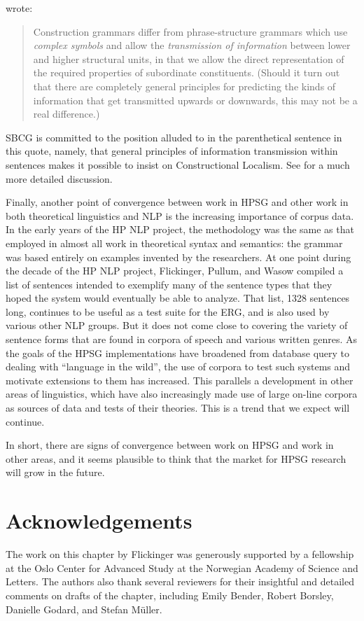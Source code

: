 \documentclass[output=paper]{langsci/langscibook}
\begin{document}
\citet[]{Fillmore88a} wrote:
\begin{quote}
Construction grammars differ from phrase-structure grammars which use \emph{complex symbols} and
allow the \emph{transmission of information} between lower and higher structural units, in that we
allow the direct representation of the required properties of subordinate constituents.  (Should it
turn out that there are completely general principles for predicting the kinds of information that
get transmitted upwards or downwards, this may not be a real difference.) \citep[]{Fillmore88a}
\end{quote}
SBCG is committed to the position alluded to in the parenthetical sentence in this quote, namely, that general principles of information transmission within sentences makes it possible to insist on Constructional Localism.   See  for a much more detailed discussion.  

Finally, another point of convergence between work in HPSG and other work in both theoretical linguistics and NLP is the increasing importance of corpus data. In the early years of the HP NLP project, the methodology was the same as that employed in almost all work in theoretical syntax and semantics:  the grammar was based entirely on examples invented by the researchers.  At one point during the decade of the HP NLP project, Flickinger, Pullum, and Wasow compiled a list of sentences intended to exemplify many of the sentence types that they hoped the system would eventually be able to analyze.  That list, 1328 sentences long, continues to be useful as a test suite for the ERG, and is also used by various other NLP groups.  But it does not come close to covering the variety of sentence forms that are found in corpora of speech and various written genres.  As the goals of the HPSG implementations have broadened from database query to dealing with ``language in the wild'', the use of corpora to test such systems and motivate extensions to them has increased.  This parallels a development in other areas of linguistics, which have also increasingly made use of large on-line corpora as sources of data and tests of
their theories.  This is a trend that we expect will continue.
 
In short, there are signs of convergence between work on HPSG and work in other areas, and it seems plausible to think that the market for HPSG research will grow in the future.

\section*{Acknowledgements}
The work on this chapter by Flickinger was generously supported by a fellowship at the Oslo Center for Advanced Study at the Norwegian Academy of Science and Letters.  The authors also thank several reviewers for their insightful and detailed comments on drafts of the chapter, including Emily Bender, Robert Borsley, Danielle Godard, and Stefan M{\"u}ller.


{\sloppy
\printbibliography[heading=subbibliography,notkeyword=this]
}
\end{document}
